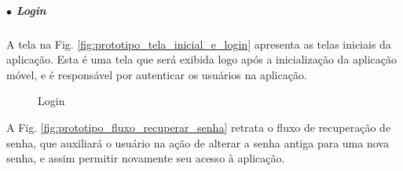 \subparagraph*{$\bullet$ Login} \hfill

A tela na Fig. \ref{fig:prototipo_tela_inicial_e_login} apresenta as telas iniciais da aplicação. Esta é uma tela que será exibida logo após a inicialização da aplicação móvel, e é responsável por autenticar os usuários na aplicação. 

\begin{figure}[H]
    \centering
    \caption{Login}
\end{figure}

A Fig. \ref{fig:prototipo_fluxo_recuperar_senha} retrata o fluxo de recuperação de senha, que auxiliará o usuário na ação de alterar a senha antiga para uma nova senha, e assim permitir novamente seu acesso à aplicação.


